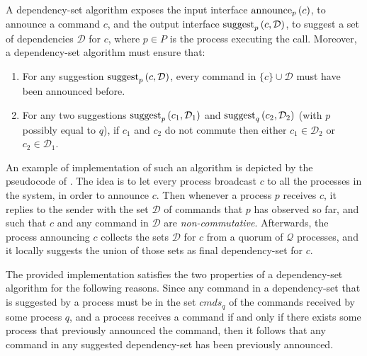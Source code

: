 A dependency-set algorithm exposes the input interface $\operatorname{announce}_p\left( c \right)$, to announce a command $c$, and the output interface $\operatorname{suggest}_p \left( c,\mathcal{D}\right)$, to suggest a set of dependencies $\mathcal{D}$ for $c$, where $p\in P$ is the process executing the call.  
Moreover, a dependency-set algorithm must ensure that:
\begin{enumerate}
    \item For any suggestion $\operatorname{suggest}_p \left( c,\mathcal{D}\right)$, every command in $\{c\}\cup \mathcal{D}$ must have been announced before.
    \item For any two suggestions $\operatorname{suggest}_p \left( c_1,\mathcal{D}_1\right)$ and $\operatorname{suggest}_q \left( c_2,\mathcal{D}_2\right)$ (with $p$ possibly equal to $q$),  if $c_1$ and $c_2$ do not commute then either $c_1\in \mathcal{D}_2$ or $c_2 \in \mathcal{D}_1$.
\end{enumerate}

An example of implementation of such an algorithm is depicted by the pseudocode of . The idea is to let every process broadcast $c$ to all the processes in the system, in order to announce $c$. Then whenever a process $p$ receives $c$, it replies to the sender with the set $\mathcal{D}$ of commands that $p$ has observed so far, and such that $c$ and any command in $\mathcal{D}$ are \textit{non-commutative}. Afterwards, the process announcing $c$ collects the sets $\mathcal{D}$ for $c$ from a quorum of $\mathcal{Q}$ processes, and it locally suggests the union of those sets as final dependency-set for $c$.

The provided implementation satisfies the two properties of a dependency-set algorithm for the following reasons. Since any command in a dependency-set that is suggested by a process must be in the set $cmds_q$ of the commands received by some process $q$, and a process receives a command if and only if there exists some process that previously announced the command, then it follows that any command in any suggested dependency-set has been previously announced. 

